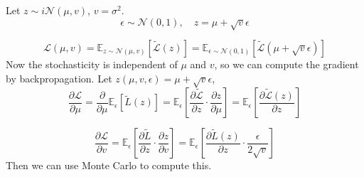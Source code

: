 \documentclass[../main.tex]{subfiles}
\begin{document}
\begin{note}[A example]
   Let $z \sim i \mathcal{N}(\mu, v)$, $v = \sigma^{2}$.
   \[
   \epsilon \sim  \mathcal{N}(0,1), \quad z = \mu + \sqrt{v} \epsilon
   \]

   \[
   \mathcal{L}(\mu, v) = \mathbb{E}_{z \sim  \mathcal{N}(\mu, v)} \left[ \tilde{\mathcal{L}}(z) \right]  = \mathbb{E}_{\epsilon \sim  \mathcal{N}(0,1)} \left[ \tilde{\mathcal{L}} (\mu + \sqrt{v} \epsilon) \right] 
   \]
   Now the stochasticity is independent of $\mu$ and $v$, so we can compute the gradient by backpropagation.
   Let $z(\mu, v, \epsilon) = \mu + \sqrt{v} \epsilon$, 
   \[
   \frac{\partial \mathcal{L}}{\partial \mu} = \frac{\partial }{\partial \mu} \mathbb{E}_{\epsilon} \left[ \tilde{L}(z) \right] = \mathbb{E}_{\epsilon} \left[ \frac{\partial \tilde{\mathcal{L}}}{\partial z} \cdot  \frac{\partial z}{\partial \mu} \right]  = \mathbb{E}_{\epsilon} \left[ \frac{\partial \tilde{\mathcal{L}}(z)}{\partial z} \right] 
   \]

   \[
   \frac{\partial \mathcal{L}}{\partial v} = \mathbb{E}_{\epsilon} \left[ \frac{\partial \tilde{L}}{\partial z} \cdot  \frac{\partial z}{\partial v} \right]  = \mathbb{E}_{\epsilon} \left[ \frac{\partial \tilde{L}(z)}{\partial z} \cdot  \frac{\epsilon}{2 \sqrt{ v}} \right] 
   \]
   Then we can use Monte Carlo to compute this.
\end{note} 
\end{document}
